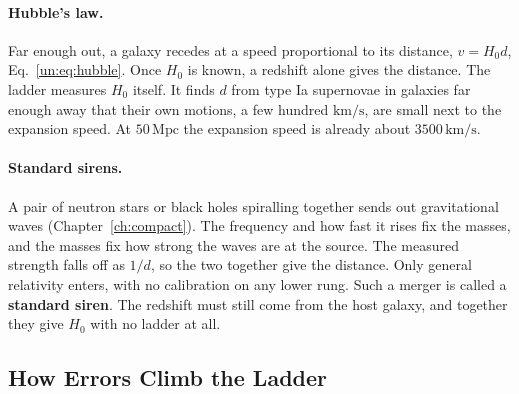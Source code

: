 \paragraph{Hubble's law.} Far enough out, a galaxy recedes at a speed proportional to its distance, $v=H_0d$, Eq.~\eqref{un:eq:hubble}. Once $H_0$ is known, a redshift alone gives the distance. The ladder measures $H_0$ itself. It finds $d$ from type Ia supernovae in galaxies far enough away that their own motions, a few hundred $\mathrm{km/s}$, are small next to the expansion speed. At $50\,\mathrm{Mpc}$ the expansion speed is already about $3500\,\mathrm{km/s}$.

\paragraph{Standard sirens.} A pair of neutron stars or black holes spiralling together sends out gravitational waves (Chapter~\ref{ch:compact}). The frequency and how fast it rises fix the masses, and the masses fix how strong the waves are at the source. The measured strength falls off as $1/d$, so the two together give the distance. Only general relativity enters, with no calibration on any lower rung. Such a merger is called a \textbf{standard siren}. The redshift must still come from the host galaxy, and together they give $H_0$ with no ladder at all.

\subsection{How Errors Climb the Ladder}
\label{as:sec:ladder_errors}

